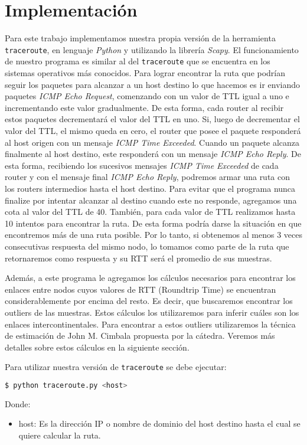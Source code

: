 \section{Implementación}

Para este trabajo implementamos nuestra propia versión de la herramienta \texttt{traceroute}, en lenguaje \emph{Python} y utilizando la librería \emph{Scapy}. El funcionamiento de nuestro programa es similar al del \texttt{traceroute} que se encuentra en los sistemas operativos más conocidos. Para lograr encontrar la ruta que podrían seguir los paquetes para alcanzar a un host destino lo que hacemos es ir enviando paquetes \emph{ICMP Echo Request}, comenzando con un valor de TTL igual a uno e incrementando este valor gradualmente. De esta forma, cada router al recibir estos paquetes decrementará el valor del TTL en uno. Si, luego de decrementar el valor del TTL, el mismo queda en cero, el router que posee el paquete responderá al host origen con un mensaje \emph{ICMP Time Exceeded}. Cuando un paquete alcanza finalmente al host destino, este responderá con un mensaje \emph{ICMP Echo Reply}. De esta forma, recibiendo los sucesivos mensajes \emph{ICMP Time Exceeded} de cada router y con el mensaje final \emph{ICMP Echo Reply}, podremos armar una ruta con los routers intermedios hasta el host destino.
Para evitar que el programa nunca finalize por intentar alcanzar al destino cuando este no responde, agregamos una cota al valor del TTL de 40.
También, para cada valor de TTL realizamos hasta 10 intentos para encontrar la ruta. De esta forma podría darse la situación en que encontremos más de una ruta posible. Por lo tanto, si obtenemos al menos 3 veces consecutivas respuesta del mismo nodo, lo tomamos como parte de la ruta que retornaremos como respuesta y su RTT será el promedio de sus muestras.

Además, a este programa le agregamos los cálculos necesarios para encontrar los enlaces entre nodos cuyos valores de RTT (Roundtrip Time) se encuentran considerablemente por encima del resto. Es decir, que buscaremos encontrar los outliers de las muestras. Estos cálculos los utilizaremos para inferir cuáles son los enlaces intercontinentales. Para encontrar a estos outliers utilizaremos la técnica de estimación de John M. Cimbala propuesta por la cátedra. Veremos más detalles sobre estos cálculos en la siguiente sección.

Para utilizar nuestra versión de \texttt{traceroute} se debe ejecutar:

\begin{lstlisting}[language=bash]
  $ python traceroute.py <host> 
\end{lstlisting}

Donde:

\begin{itemize}
\item host: Es la dirección IP o nombre de dominio del host destino hasta el cual se quiere calcular la ruta.
\end{itemize}